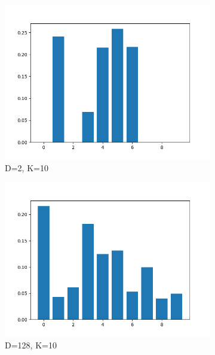 \documentclass[conference]{IEEEtran}
\begin{document}
\begin{figure}[H]
\begin{subfigure}[b]{.5\linewidth}
        \centering
        \includegraphics[width=1\linewidth]{images/eval/weights_BGMM_d2_k10.png}
        \caption{D=2, K=10}
        \label{fig:dblp_weights_d2_k10}
    \end{subfigure}%
    \begin{subfigure}[b]{.5\linewidth}
        \centering
        \includegraphics[width=1\linewidth]{images/eval/weights_BGMM_d128_k10.png}
        \caption{D=128, K=10}
        \label{fig:dblp_weights_d128_k10}
    \end{subfigure}
    \begin{subfigure}[b]{.5\linewidth}
        \centering

\end{subfigure}
\end{figure}
\end{document}
